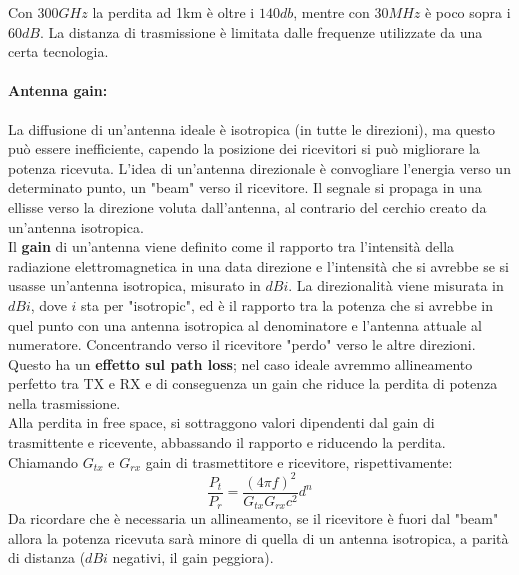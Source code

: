 Con $300GHz$ la perdita ad 1km è oltre i $140db$, mentre con $30MHz$ è poco sopra i $60dB$. La distanza di trasmissione è limitata dalle frequenze utilizzate da una certa tecnologia.\\

\newpage

\paragraph{Antenna gain:} La diffusione di un'antenna ideale è isotropica (in tutte le direzioni), ma questo può essere inefficiente, capendo la posizione dei ricevitori si può migliorare la potenza ricevuta. L'idea di un'antenna direzionale è convogliare l'energia verso un determinato punto, un "beam" verso il ricevitore. Il segnale si propaga in una ellisse verso la direzione voluta dall'antenna, al contrario del cerchio creato da un'antenna isotropica.\\

Il \textbf{gain} di un'antenna viene definito come il rapporto tra l'intensità della radiazione elettromagnetica in una data direzione e l'intensità che si avrebbe se si usasse un'antenna isotropica, misurato in $dBi$. La direzionalità viene misurata in $dBi$, dove $i$ sta per "isotropic", ed è il rapporto tra la potenza che si avrebbe in quel punto con una antenna isotropica al denominatore e l'antenna attuale al numeratore. Concentrando verso il ricevitore "perdo" verso le altre direzioni. \\

Questo ha un \textbf{effetto sul path loss}; nel caso ideale avremmo allineamento perfetto tra TX e RX e di conseguenza un gain che riduce la perdita di potenza nella trasmissione. \\

Alla perdita in free space, si sottraggono valori dipendenti dal gain di trasmittente e ricevente, abbassando il rapporto e riducendo la perdita. Chiamando $G_{tx}$ e $G_{rx}$ gain di trasmettitore e ricevitore, rispettivamente: 
$$ \frac{P_t}{P_r} = \frac{(4 \pi f)^2}{G_{tx} G_{rx} c^2} d^n $$
Da ricordare che è necessaria un allineamento, se il ricevitore è fuori dal "beam" allora la potenza ricevuta sarà minore di quella di un antenna isotropica, a parità di distanza ($dBi$ negativi, il gain peggiora).\\

\newpage

